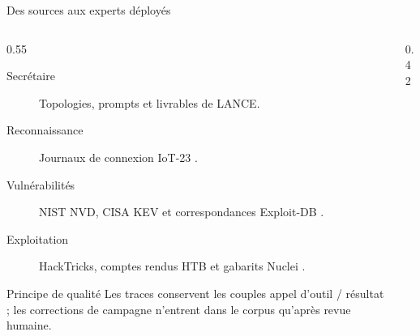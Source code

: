 \documentclass[aspectratio=169,10pt]{beamer}
\begin{document}
\begin{frame}{Des sources aux experts déployés}
  \begin{columns}[T,onlytextwidth]
    \begin{column}{0.55\textwidth}
      \small
      \begin{description}
        \item[Secrétaire] Topologies, prompts et livrables de LANCE.
        \item[Reconnaissance] Journaux de connexion IoT-23
          \cite{garcia2020iot23}.
        \item[Vulnérabilités] NIST NVD, CISA KEV et correspondances Exploit-DB
          \cite{nistnvdapi,cisakev,offsecexploitdb}.
        \item[Exploitation] HackTricks, comptes rendus HTB et gabarits Nuclei
          \cite{hacktricksrepo,momenbaselhtb,zweilosechtb,nucleitemplates}.
      \end{description}
      \begin{alertblock}{Principe de qualité}
        Les traces conservent les couples appel d'outil / résultat ; les
        corrections de campagne n'entrent dans le corpus qu'après revue humaine.
      \end{alertblock}
    \end{column}
    \begin{column}{0.42\textwidth}
      \centering
    \end{column}
  \end{columns}
\end{frame}
\end{document}
